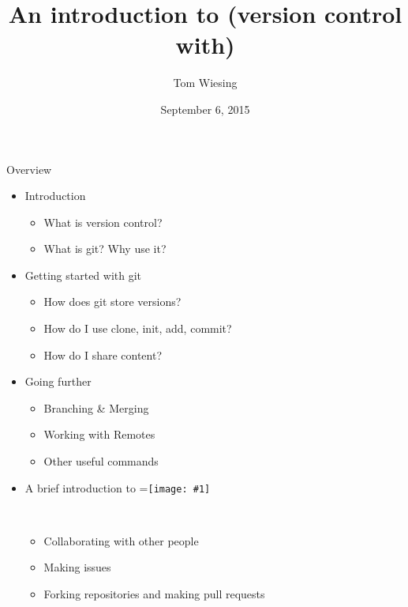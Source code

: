 \documentclass{beamer}
\title{An introduction to (version control with) \logoimage{imgs/git_logo}{40px}}
\author{Tom Wiesing}
\institute{CS Club}
\date{September 6, 2015}
\newcommand{\logoimage}[2]{\begingroup
\setbox0=\hbox{\texttt{[image: \#1]}}%
\parbox{\wd0}{\box0}\endgroup\ }
\newcommand{\github}{\logoimage{imgs/github_logo}{8pt}}
\begin{document}
    \frame{\titlepage}
    
    \begin{frame}{Overview}
      \begin{itemize}
          \item Introduction
          \begin{itemize}
            \item What is version control?
            \item What is git? Why use it?
          \end{itemize}
          \item Getting started with git
          \begin{itemize}
            \item How does git store versions?
            \item How do I use clone, init, add, commit?
            \item How do I share content?
          \end{itemize}
          \item Going further
          \begin{itemize}
            \item Branching \& Merging
            \item Working with Remotes
            \item Other useful commands
          \end{itemize}
          \item A brief introduction to \github
          \begin{itemize}
            \item Collaborating with other people
            \item Making issues
            \item Forking repositories and making pull requests
          \end{itemize}
      \end{itemize}
    \end{frame}
    
    
    
    
    
\end{document}
